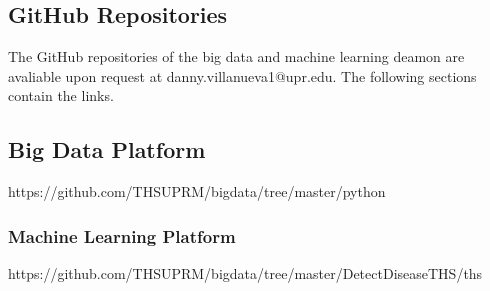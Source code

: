 \documentclass[12pt]{report}
\begin{document}
\begin{appendices}
\chapter{GitHub Repositories}
The GitHub repositories of the big data and machine learning deamon are avaliable upon request at danny.villanueva1@upr.edu. The following sections contain the links.

\section{Big Data Platform}
https://github.com/THSUPRM/bigdata/tree/master/python

\subsection{Machine Learning Platform}
https://github.com/THSUPRM/bigdata/tree/master/DetectDiseaseTHS/ths
\end{appendices}
\end{document}
